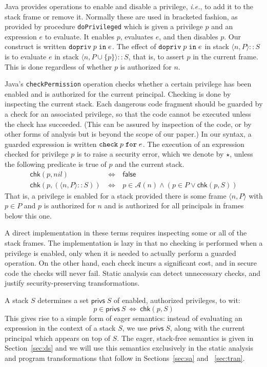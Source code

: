 \documentclass[submission,copyright,creativecommons]{eptcs}
\newcommand{\ie}{{\em i.e.}}
\newcommand{\enable}[2]{\ENABLE\;#1\;\IN\;#2}
\newcommand{\chk}[2]{\CHK\;#1\;\FOR\;#2}
\newcommand{\FOR}{\mbox{\texttt{for}}}
\newcommand{\IN}{\mbox{\texttt{in}}}
\newcommand{\A}{\mathcal{A}}
\newcommand{\union}{\cup}
\newcommand{\tuple}[1]{\langle #1 \rangle}
\newcommand{\ENABLE}{\mbox{\texttt{dopriv}}}
\newcommand{\CHK}{\mbox{\texttt{check}}}
\renewcommand{\check}{\textsf{chk}}
\newcommand{\privs}{\textsf{privs}}
\newcommand{\n}{n} \newcommand{\p}{p} \newcommand{\Ps}{\Pi} \newcommand{\h}{h}
\renewcommand{\iff}{\mathbin{\:\Leftrightarrow\:}}
\begin{document}
Java provides operations to enable and disable a privilege, \ie, to
add it to the stack frame or remove it.  Normally these are used in
bracketed fashion, as provided by procedure \texttt{doPrivileged} which is given a
privilege $\p$ and an expression $e$ to evaluate.  It enables $\p$,
evaluates $e$, and then disables $\p$.  Our construct is written
$\enable{\p}{e}$.  The effect of $\enable{\p}{e}$ in stack
$\tuple{\n,P}::S$ is to evaluate $e$ in stack
$\tuple{\n,P\union\{\p\}}::S $, that is, to assert $\p$ in the
current frame.
This is done regardless of whether $\p$ is authorized for $\n$.


Java's \texttt{checkPermission} operation checks whether a certain
privilege has been enabled and is authorized for the current
principal.  Checking is done by inspecting the current stack.  Each
dangerous code fragment should be guarded by a check for an associated
privilege, so that the code cannot be executed unless the check has succeeded.  
(This can be assured by inspection of the code, or by other forms of analysis 
\cite{CentonzeFP07} but is beyond the scope of our paper.)
In our syntax, a guarded expression is written
$\chk{\p}{e}$.  The execution of an expression checked for privilege
$\p$ is to raise a security error, which we denote by $\star$, unless
the following predicate is true of $\p$ and the current stack.
\begin{eqnarray*}
\check(\p,nil) & \iff & \mathsf{false} \\
\check(\p,(\tuple{\n,P}::S)) & \iff & 
 \p\in \A(\n) \land (\p\in P \lor \check(p,S)) 
\end{eqnarray*}
That is, a privilege is enabled for a stack provided
there is some frame $\tuple{\n,P}$ with $\p\in P$ and $\p$ is authorized for
$\n$ and is authorized for all principals in frames below this one. 



A direct implementation in these terms requires inspecting some or all
of the stack frames.  The implementation is lazy in that no
checking is performed when a privilege is enabled, only when it is
needed to actually perform a guarded operation. On the other hand,
each check incurs a significant cost, and in secure code the checks
will never fail.  Static analysis can detect unnecessary checks, and
justify security-preserving transformations.

A stack $S$ determines a set $\privs\;S$ of enabled, authorized
privileges, to wit:
\[ \p\in\privs~S \iff \check(\p, S) \]
This gives rise to a simple form of eager semantics: instead of
evaluating an expression in the context of a stack $S$, we use
$\privs\;S$, along with the current principal which appears on top of
$S$.  The eager, stack-free semantics is given in Section~\ref{sec:ds}
and we will use this semantics exclusively in the static analysis and 
program transformations that follow in Sections~\ref{sec:sa} and ~\ref{sec:tran}.
\end{document}
